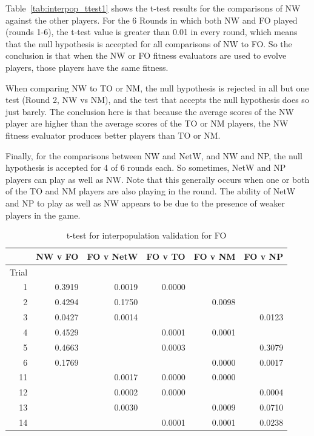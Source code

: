 Table~\ref{tab:interpop_ttest1} shows the t-test results for the comparisons of
NW against the other players. For the 6 Rounds in which both NW and FO played
(rounds 1-6), the t-test value is greater than 0.01 in every round, which means
that the null hypothesis is accepted for all comparisons of NW to FO. So the
conclusion is that when the NW or FO fitness evaluators are used to evolve
players, those players have the same fitness.

When comparing NW to TO or NM, the null hypothesis is rejected in all but one
test (Round 2, NW vs NM), and the test that accepts the null hypothesis does so
just barely. The conclusion here is that because the average scores of the NW
player are higher than the average scores of the TO or NM players, the NW
fitness evaluator produces better players than TO or NM.

Finally, for the comparisons between NW and NetW, and NW and NP, the null
hypothesis is accepted for 4 of 6 rounds each. So sometimes, NetW and NP players
can play as well as NW. Note that this generally occurs when one or both of the
TO and NM players are also playing in the round. The ability of NetW and NP to
play as well as NW appears to be due to the presence of weaker players in the
game.

\begin{table}[htbp]
  \centering
  \caption{t-test for interpopulation validation for FO}
    \begin{tabular}{rrrrrr}
    \toprule
          & NW v FO & FO v NetW & FO v TO & FO v NM & FO v NP \\
    \midrule
    Trial &        &        &        &        &        \\
    1     & 0.3919 & 0.0019 & 0.0000 &        &        \\
    2     & 0.4294 & 0.1750 &        & 0.0098 &        \\
    3     & 0.0427 & 0.0014 &        &        & 0.0123 \\
    4     & 0.4529 &        & 0.0001 & 0.0001 &        \\
    5     & 0.4663 &        & 0.0003 &        & 0.3079 \\
    6     & 0.1769 &        &        & 0.0000 & 0.0017 \\
    11    &        & 0.0017 & 0.0000 & 0.0000 &        \\
    12    &        & 0.0002 & 0.0000 &        & 0.0004 \\
    13    &        & 0.0030 &        & 0.0009 & 0.0710 \\
    14    &        &        & 0.0001 & 0.0001 & 0.0238 \\
    \bottomrule
    \end{tabular}%
  \label{tab:interpop_ttest2}%
\end{table}%

